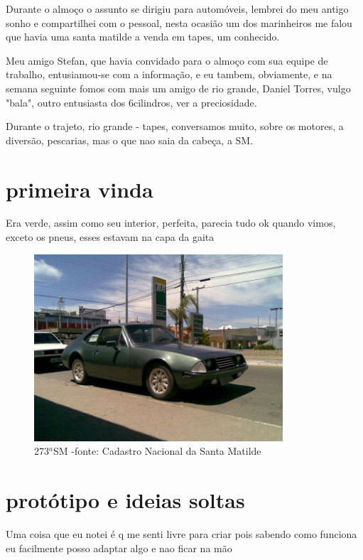 \documentclass[a4paper]{report}
\begin{document}
Durante o almo\c{c}o o assunto se dirigiu para autom\'oveis, lembrei do meu antigo sonho e compartilhei com o pessoal, nesta ocasi\~ao um dos marinheiros
me falou que havia uma santa matilde a venda em tapes, um conhecido.

Meu amigo Stefan, que havia convidado para o almo\c{c}o com sua equipe de trabalho, entusiamou-se com a informa\c{c}\~ao, e eu tambem, obviamente, e na semana 
seguinte fomos com mais um amigo de rio grande, Daniel Torres, vulgo "bala", outro entusiasta dos 6cilindros, ver a preciosidade.

Durante o trajeto, rio grande - tapes, conversamos muito, sobre os motores, a divers\~ao, pescarias, mas o que nao saia da cabe\c{c}a, a SM.   

\section*{primeira vinda}

Era verde, assim como seu interior, perfeita, parecia tudo ok quando vimos, exceto os pneus, esses estavam na capa da gaita

\begin{figure}[!htb]
\centering
\includegraphics{sm273}
\caption{273$^{a}$SM -fonte: Cadastro Nacional da Santa Matilde}
\label{sm_273}
\end{figure}

\section*{prot\'otipo e ideias soltas}
Uma coisa que eu notei \'e q me senti livre para criar pois sabendo como funciona eu facilmente posso adaptar algo e nao ficar na m\~ao

\printindex
\end{document}
